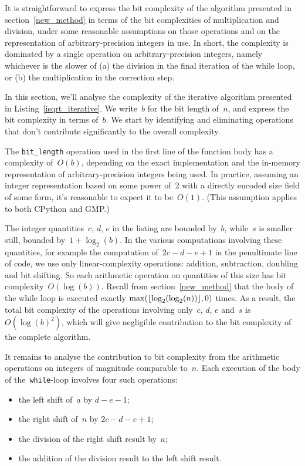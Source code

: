 \documentclass[a4paper]{article}
\DeclarePairedDelimiter\floor{\lfloor}{\rfloor}
\theoremstyle{plain}
\theoremstyle{definition}
\begin{document}
It is straightforward to express the bit complexity of the algorithm presented
in section~\ref{new_method} in terms of the bit complexities of multiplication
and division, under some reasonable assumptions on those operations and on the
representation of arbitrary-precision integers in use. In short, the complexity
is dominated by a single operation on arbitrary-precision integers, namely
whichever is the slower of (a) the division in the final iteration of the while
loop, or (b) the multiplication in the correction step.

In this section, we'll analyse the complexity of the iterative algorithm
presented in Listing~\ref{isqrt_iterative}. We write~$b$ for the bit length
of~$n$, and express the bit complexity in terms of~$b$. We start by identifying
and eliminating operations that don't contribute significantly to the overall
complexity.

The \lstinline$bit_length$ operation used in the first line of the function
body has a complexity of~$O(b)$, depending on the exact implementation and the
in-memory representation of arbitrary-precision integers being used. In
practice, assuming an integer representation based on some power of~$2$ with a
directly encoded size field of some form, it's reasonable to expect it to
be~$O(1)$. (This assumption applies to both CPython and GMP.)

The integer quantities~$c$, $d$, $e$ in the listing are bounded by~$b$,
while~$s$ is smaller still, bounded by~$1 + \log_2(b)$. In the various
computations involving these quantities, for example the computation of~$2c - d
- e + 1$ in the penultimate line of code, we use only linear-complexity
operations: addition, subtraction, doubling and bit shifting. So each
arithmetic operation on quantities of this size has bit
complexity~$O(\log(b))$. Recall from section~\ref{new_method} that the body of
the while loop is executed exactly $\max(\floor{\log_2(\log_2(n))}, 0)$ times.
As a result, the total bit complexity of the operations involving only~$c$,
$d$, $e$ and~$s$ is~$O(\log(b)^2)$, which will give negligible contribution to
the bit complexity of the complete algorithm.

It remains to analyse the contribution to bit complexity from the arithmetic
operations on integers of magnitude comparable to~$n$. Each execution of the
body of the~\lstinline$while$-loop involves four such operations:

\begin{itemize}
  \item the left shift of~$a$ by $d - e - 1$;
  \item the right shift of~$n$ by $2c - d - e + 1$;
  \item the division of the right shift result by~$a$;
  \item the addition of the division result to the left shift result.
\end{itemize}
\end{document}
